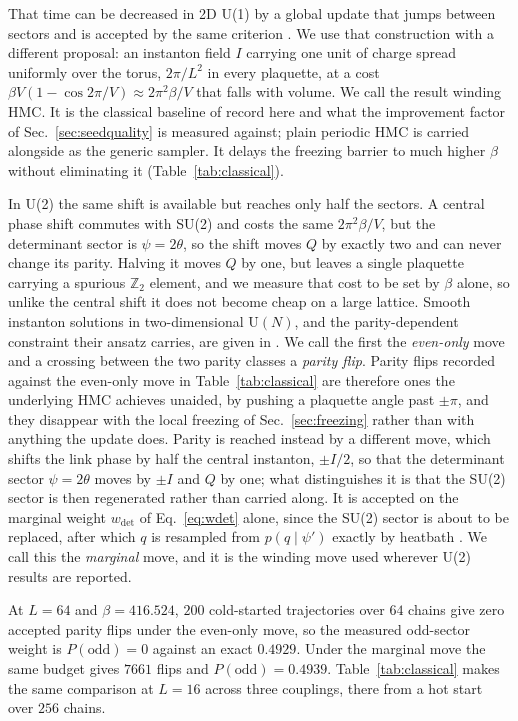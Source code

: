\documentclass[prd, twocolumn, superscriptaddress, nofootinbib,floatfix]{revtex4-2}
\DeclareRobustCommand{\Eq}[1]{Eq.~\eqref{eq:#1}}
\DeclareRobustCommand{\sect}[1]{Sec.~\ref{sec:#1}}
\DeclareRobustCommand{\tb}[1]{Table~\ref{tab:#1}}
\begin{document}
That time can be decreased in 2D U(1) by a global update that jumps between
sectors and is accepted by the same criterion \cite{albandea2021}. We use that
construction with a different proposal: an instanton field $I$ carrying one unit
of charge spread uniformly over the torus, $2\pi/L^2$ in every plaquette, at a cost
$\beta V(1-\cos2\pi/V)\approx2\pi^2\beta/V$ that falls with volume. We call the
result winding HMC. It is the classical baseline of record here and what the
improvement factor of \sect{seedquality} is measured against; plain periodic HMC
is carried alongside as the generic sampler. It delays the freezing barrier to
much higher $\beta$ without eliminating it (\tb{classical}).

In U(2) the same shift is available but reaches only half the sectors. A central
phase shift commutes with SU(2) and costs the same $2\pi^2\beta/V$, but the
determinant sector is $\psi=2\theta$, so the shift moves $Q$ by exactly two and
can never change its parity. Halving it moves $Q$ by one, but leaves a single
plaquette carrying a spurious $\mathbb{Z}_2$ element, and we measure that cost
to be set by $\beta$ alone, so unlike the central shift it does not become cheap
on a large lattice. Smooth instanton solutions in two-dimensional
$\mathrm{U}(N)$, and the parity-dependent constraint their ansatz carries, are
given in \cite{rouenhoff2025}. We call the first the \emph{even-only} move and a crossing between the two
parity classes a \emph{parity flip}. Parity flips recorded against the even-only
move in \tb{classical} are therefore ones the underlying HMC achieves unaided,
by pushing a plaquette angle past $\pm\pi$, and they disappear with the local
freezing of \sect{freezing} rather than with anything the update does. Parity is reached instead
by a different move, which shifts the link phase by half the central instanton,
$\pm I/2$, so that the determinant sector $\psi=2\theta$ moves by $\pm I$ and
$Q$ by one; what distinguishes it is that the SU(2) sector is then regenerated
rather than carried along. It is accepted on the marginal weight $w_{\det}$ of \Eq{wdet}
alone, since the SU(2) sector is about to be replaced, after which $q$ is
resampled from $p(q\mid\psi')$ exactly by heatbath
\cite{creutz1980,kennedypendleton1985}. We call this the \emph{marginal} move,
and it is the winding move used wherever U(2) results are reported.

At $L=64$ and $\beta=416.524$, $200$ cold-started trajectories
over $64$ chains give zero accepted parity flips under the even-only move, so the
measured odd-sector weight is $P(\mathrm{odd})=0$ against an exact $0.4929$.
Under the marginal move the same budget gives $7661$ flips and
$P(\mathrm{odd})=0.4939$. \tb{classical} makes the same comparison at $L=16$ across three
couplings, there from a hot start over $256$ chains.
\end{document}
